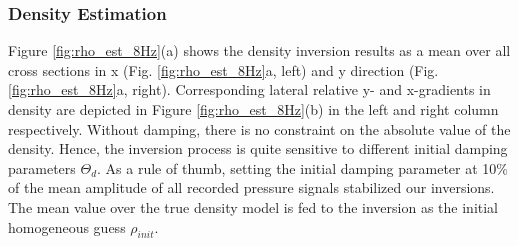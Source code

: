 \documentclass{article}
\begin{document}
	\subsubsection*{Density Estimation} 
	
	Figure \ref{fig:rho_est_8Hz}(a) shows the density inversion results as a mean over all cross sections in x (Fig. \ref{fig:rho_est_8Hz}a, left) and y direction (Fig. \ref{fig:rho_est_8Hz}a, right). Corresponding lateral relative y- and x-gradients in density are depicted in Figure \ref{fig:rho_est_8Hz}(b) in the left and right column respectively. Without damping, there is no constraint on the absolute value of the density.  Hence, the inversion process is quite sensitive to different initial damping parameters $\Theta_{d}$. As a rule of thumb, setting the initial damping parameter at 10$\%$ of the mean amplitude of all recorded pressure signals stabilized our inversions. The mean value over the true density model is fed to the inversion as the initial homogeneous guess $\rho_{init}$. \\
	
\end{document}
